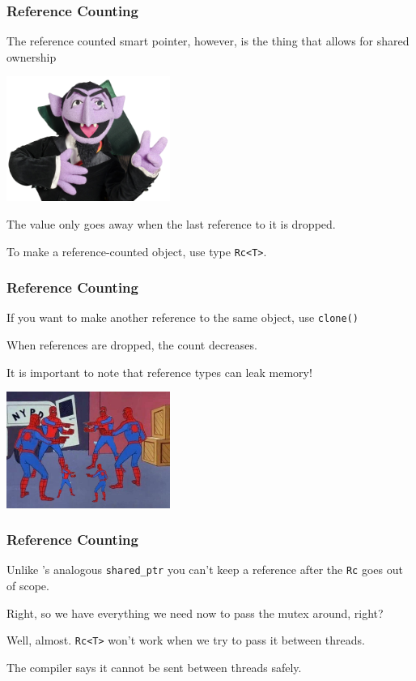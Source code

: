 \begin{frame}
\frametitle{Reference Counting}

The reference counted smart pointer, however, is the thing that allows for shared ownership

\begin{center}
	\includegraphics[width=0.4\textwidth]{images/countvoncount.png}
\end{center}

The value only goes away when the last reference to it is dropped.

To make a reference-counted object, use type \texttt{Rc<T>}.

\end{frame}


\begin{frame}
\frametitle{Reference Counting}
If you want to make another reference to the same object, use \texttt{clone()}

When references are dropped, the count decreases.

It is important to note that reference types can leak memory!

\begin{center}
	\includegraphics[width=0.4\textwidth]{images/reference-cycle.jpg}
\end{center}

\end{frame}


\begin{frame}
\frametitle{Reference Counting}

Unlike \CPP's analogous \texttt{shared\_ptr} you can't keep a reference after the \texttt{Rc} goes out of scope.

Right, so we have everything we need now to pass the mutex around, right? 

Well, almost. \texttt{Rc<T>} won't work when we try to pass it between threads.

The compiler says it cannot be sent between threads safely. 

\end{frame}


